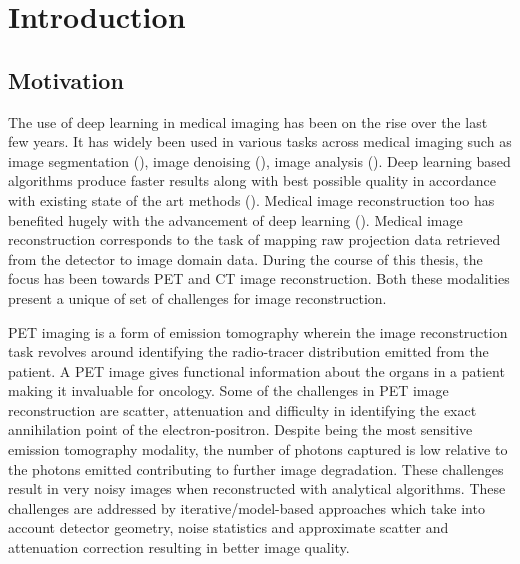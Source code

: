 
\chapter*{Introduction} %
\label{Introduction} %


\section{Motivation}

The use of deep learning in medical imaging has been on the rise over the last few years. It has widely been used in various tasks across medical imaging such as image segmentation  (\cite{ronneberger2015u,guo2019deep,sinha2019multi,dolz2018hyperdense,hatt2018first}), image denoising (\cite{kadimesetty2018convolutional,li2020sacnn,chen2017low,yang2018low}), image analysis (\cite{litjens2017survey,amyar20193,cui2018artificial}). %
Deep learning based algorithms produce faster results along with best possible quality in accordance with existing state of the art methods (\cite{leuschner2021quantitative}). Medical image reconstruction too has benefited hugely with the advancement of deep learning (\cite{reader2020deep,zhang2020review}).
Medical image reconstruction corresponds to the task of mapping raw projection data retrieved from the detector to image domain data. During the course of this thesis, the focus has been towards \ac{PET} and \ac{CT} image reconstruction. Both these modalities present a unique of set of challenges for image reconstruction. 
 
\ac{PET} imaging is a form of emission tomography wherein the image reconstruction task revolves around identifying the radio-tracer distribution emitted from the patient. A \ac{PET} image gives functional information about the organs in a patient making it invaluable for oncology. Some of the challenges in \ac{PET} image reconstruction are scatter, attenuation and difficulty in identifying the exact annihilation point of the electron-positron. Despite being the most sensitive emission tomography modality, the number of photons captured is low relative to the photons emitted contributing to further image degradation. These challenges result in very noisy images when reconstructed with analytical algorithms. These challenges are addressed by  iterative/model-based approaches which take into account detector geometry, noise statistics and approximate scatter and attenuation correction resulting in better image quality. 

